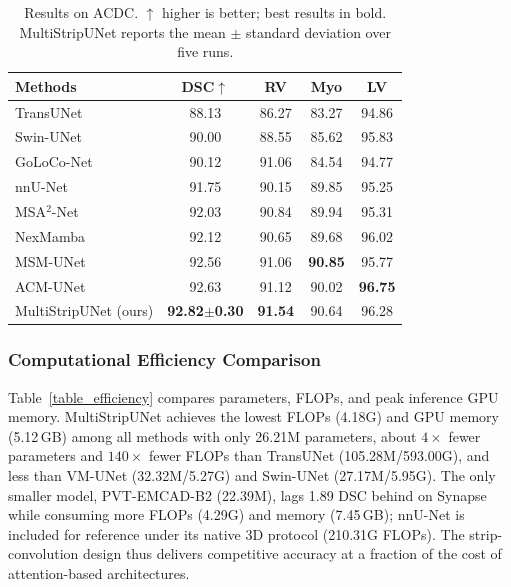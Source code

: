 \documentclass{llncs}
\begin{document}
\begin{table}[!htbp]
\centering
\footnotesize
\caption{Results on ACDC. $\uparrow$ higher is better; best results in bold. MultiStripUNet reports the mean $\pm$ standard deviation over five runs.}
\label{table2}
\begin{tabular}{l|c|ccc}
\hline
Methods & DSC$\uparrow$ & RV & Myo & LV \\
\hline
TransUNet   \cite{chen2021transunet} & 88.13 & 86.27 & 83.27 & 94.86 \\
Swin-UNet   \cite{cao2021swinunet}   & 90.00 & 88.55 & 85.62 & 95.83 \\
GoLoCo-Net  \cite{goloco2026}        & 90.12 & 91.06 & 84.54 & 94.77 \\
nnU-Net     \cite{isensee2021nnu}    & 91.75 & 90.15 & 89.85 & 95.25 \\
MSA$^2$-Net \cite{msa2net2026}       & 92.03 & 90.84 & 89.94 & 95.31 \\
NexMamba    \cite{nexmamba2026}      & 92.12 & 90.65 & 89.68 & 96.02 \\
MSM-UNet    \cite{msmunet2025}       & 92.56 & 91.06 & \textbf{90.85} & 95.77 \\
ACM-UNet    \cite{acmunet2025}       & 92.63 & 91.12 & 90.02 & \textbf{96.75} \\
\hline
MultiStripUNet (ours) & \textbf{92.82$\pm$0.30} & \textbf{91.54} & 90.64 & 96.28 \\
\hline
\end{tabular}
\end{table}

\subsubsection{Computational Efficiency Comparison}

Table~\ref{table_efficiency} compares parameters, FLOPs, and peak inference GPU memory. MultiStripUNet achieves the lowest FLOPs (4.18G) and GPU memory (5.12\,GB) among all methods with only 26.21M parameters, about $4\times$ fewer parameters and $140\times$ fewer FLOPs than TransUNet \cite{chen2021transunet} (105.28M/593.00G), and less than VM-UNet \cite{ruan2024vmunet} (32.32M/5.27G) and Swin-UNet \cite{cao2021swinunet} (27.17M/5.95G). The only smaller model, PVT-EMCAD-B2 \cite{emcad2024} (22.39M), lags 1.89 DSC behind on Synapse while consuming more FLOPs (4.29G) and memory (7.45\,GB); nnU-Net \cite{isensee2021nnu} is included for reference under its native 3D protocol (210.31G FLOPs). The strip-convolution design thus delivers competitive accuracy at a fraction of the cost of attention-based architectures.
\end{document}
